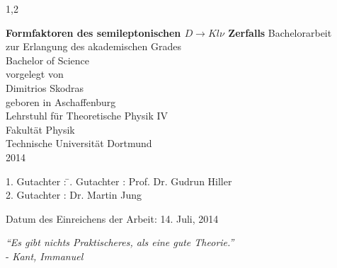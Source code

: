 \documentclass[11pt,a4paper,twoside]{report}
\begin{document}
\begin{spacing}{1,2}

%
%


\newcommand{\thetitle}{Formfaktoren des semileptonischen $D \rightarrow  K l \nu$ Zerfalls}

\thispagestyle{empty}
\begin{center}
\Huge\textbf{\thetitle}
\vfill
\vfill
\Large
Bachelorarbeit \\ zur Erlangung des akademischen Grades \\ Bachelor of Science \\
\vspace{20pt}
\normalsize
vorgelegt von \\[5pt]
{\Large Dimitrios Skodras} \\[5pt]
geboren in Aschaffenburg \\
\vspace{20pt}
Lehrstuhl für Theoretische Physik IV \\ Fakultät Physik \\
Technische Universität Dortmund \\ 2014
\end{center}
\newpage


\thispagestyle{empty}
\vspace*{\fill}
\begin{tabbing}
1. Gutachter : \=. Gutachter : \>Prof. Dr. Gudrun Hiller \\[11pt]
2. Gutachter : \>Dr. Martin Jung\\[11pt]
\end{tabbing}
\vspace{11pt}
Datum des Einreichens der Arbeit: 14. Juli, 2014
\newpage
\thispagestyle{empty}
\begin{flushright} 
\textit{``Es gibt nichts Praktischeres, als eine gute Theorie.''}\\
- \textit{Kant, Immanuel}\\
\vspace{2cm}
\end{flushright}


\end{spacing}
\end{document}
